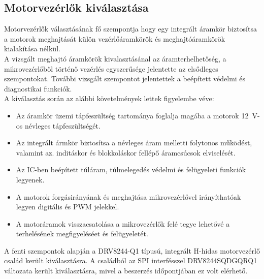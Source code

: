 \subsection{Motorvezérlők kiválasztása}
\label{subsec:motorvezerlok-kiválasztas}
Motorvezérlők választásának fő szempontja hogy egy integrált áramkör biztosítsa a motorok meghajtását
külön vezérlőáramkörök és meghajtóáramkörök kialakítása nélkül. \\
A vizsgált meghajtó áramkörök kivalasztásánal az áramterhelhetőség, a mikrovezérlőből történő vezérlés egyszerűsége
jelentette az elsődleges szempontokat. További vizsgált szempontot jelentettek a beépített védelmi és diagnostikai funkciók. \vspace{0.2cm} \\
A kiválasztás során az alábbi követelmények lettek figyelembe véve:
\begin{itemize}
    \item Az áramkör üzemi tápfeszültség tartománya foglalja magába a motorok 12~V-os névleges tápfeszültségét.
    \item Az integrált ármkör biztosítsa a névleges áram melletti folytonos működést, valamint az.
    inditáskor és blokkoláskor fellépő áramcsúcsok elviselését.
    \item Az IC-ben beépített túláram, túlmelegedés védelmi és felügyeleti funkciók legyenek.
    \item A motorok forgásirányának és meghajtása mikrovezérlővel irányíthatóak legyen digitális és PWM jelekkel.
    \item A motoráramok visszacsatolása a mikrovezérlők felé tegye lehetővé a terhelésének megfigyeléséet és felügyeletét.
\end{itemize}
A fenti szempontok alapján a DRV8244-Q1 típusú,
integrált H-hidas motorvezérlő család került kiválasztásra. A családból az SPI interfésszel DRV8244SQDGQRQ1 változata került kiválasztásra,
mivel a beszerzés időpontjában ez volt elérhető. 

